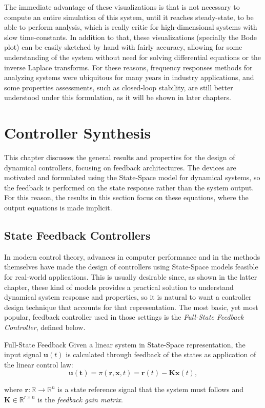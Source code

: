 \documentclass[a4paper,11pt]{book}
\numberwithin{figure}{chapter}
\numberwithin{equation}{chapter}
\numberwithin{table}{chapter}
\theoremstyle{definition}
\newtheorem{definition}{Definition}[chapter]
\newcounter{boxed-theorem}
\newcounter{boxed-definition}
\newenvironment{boxed-definition}[1]
{\begin{shaded} \begin{definition}{#1}}
{\end{definition} \end{shaded}}
\begin{document}
The immediate advantage of these visualizations is that is not necessary to compute an entire simulation of this system, until it reaches steady-state, to be able to perform analysis, which is really critic for high-dimensional systems with slow time-constants. In addition to that, these visualizations (specially the Bode plot) can be easily sketched by hand with fairly accuracy, allowing for some understanding of the system without need for solving differential equations or the inverse Laplace transforms. For these reasons, frequency responses methods for analyzing systems were ubiquitous for many years in industry applications, and some properties assessments, such as closed-loop stability, are still better understood under this formulation, as it will be shown in later chapters.

\clearpage
\chapter{Controller Synthesis}

This chapter discusses the general results and properties for the design of dynamical controllers, focusing on feedback architectures. The devices are motivated and formulated using the State-Space model for dynamical systems, so the feedback is performed on the state response rather than the system output. For this reason, the results in this section focus on these equations, where the output equations is made implicit.

\section{State Feedback Controllers}

In modern control theory, advances in computer performance and in the methods themselves have made the design of controllers using State-Space models feasible for real-world applications. This is usually desirable since, as shown in the latter chapter, these kind of models provides a practical solution to understand dynamical system response and properties, so it is natural to want a controller design technique that accounts for that representation. The most basic, yet most popular, feedback controller used in those settings is the \textit{Full-State Feedback Controller}, defined below. 

\begin{boxed-definition}{Full-State Feedback}
    Given a linear system in State-Space representation, the input signal $\bm{u}(t)$ is calculated through feedback of the states as application of the linear control law:
    \begin{equation}
        \bm{u(t)} = \pi(\bm{r}, \bm{x}, t) = \bm{r}(t) - \bm{K} \bm{x}(t)
    ,\end{equation}
    
    \noindent where $\bm{r} : \mathbb{R} \rightarrow \mathbb{R}^{n}$ is a state reference signal that the system must follows and $\bm{K} \in \mathbb{R}^{r \times n}$ is the \textit{feedback gain matrix}.
\end{boxed-definition}
\end{document}
